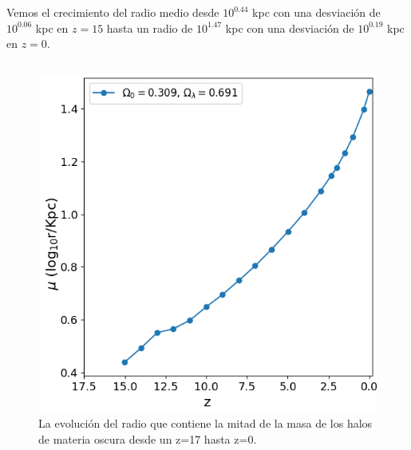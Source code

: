 \documentclass{beamer}
\begin{document}
	\begin{frame}
		\small Vemos el crecimiento del radio medio desde $10^{0.44}$ kpc con una desviación de $10^{0.06}$ kpc en $z=15$ hasta un radio de $10^{1.47}$ kpc con una desviación de $10^{0.19}$ kpc en $z=0$.
		
		\begin{columns}[t]
			\begin{column}{.5\textwidth}
				\begin{figure}
					\centering
					\includegraphics[scale=0.3]{RunCanonica/HalfMassRad_Mean_RunCanonica.png}
					\caption{\footnotesize La evolución del radio que contiene la mitad de la masa de los halos de materia oscura desde un z=17 hasta z=0.}
					\label{fig:Canon-HalfMassRadMean}
				\end{figure}
			\end{column}


\end{columns}
\end{frame}
\end{document}

